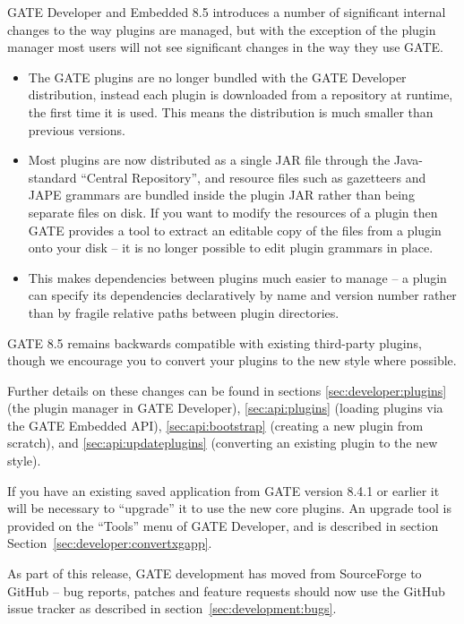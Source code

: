 
GATE Developer and Embedded 8.5 introduces a number of significant internal
changes to the way plugins are managed, but with the exception of the plugin
manager most users will not see significant changes in the way they use GATE.

\begin{itemize}
\item The GATE plugins are no longer bundled with the GATE Developer
  distribution, instead each plugin is downloaded from a repository at runtime,
  the first time it is used.  This means the distribution is much smaller than
  previous versions.
\item Most plugins are now distributed as a single JAR file through the
  Java-standard ``Central Repository'', and resource files such as gazetteers
  and JAPE grammars are bundled inside the plugin JAR rather than being
  separate files on disk.  If you want to modify the resources of a plugin
  then GATE provides a tool to extract an editable copy of the files from
  a plugin onto your disk -- it is no longer possible to edit plugin grammars
  in place.
\item This makes dependencies between plugins much easier to manage -- a plugin
  can specify its dependencies declaratively by name and version number rather
  than by fragile relative paths between plugin directories.
\end{itemize}

GATE 8.5 remains backwards compatible with existing third-party plugins, though
we encourage you to convert your plugins to the new style where possible.

Further details on these changes can be found in sections
\ref{sec:developer:plugins} (the plugin manager in GATE Developer),
\ref{sec:api:plugins} (loading plugins via the GATE Embedded API),
\ref{sec:api:bootstrap} (creating a new plugin from scratch), and
\ref{sec:api:updateplugins} (converting an existing plugin to the new style).

If you have an existing saved application from GATE version 8.4.1 or earlier it
will be necessary to ``upgrade'' it to use the new core plugins.  An upgrade
tool is provided on the ``Tools'' menu of GATE Developer, and is described in
section Section~\ref{sec:developer:convertxgapp}.


As part of this release, GATE development has moved from SourceForge to GitHub
-- bug reports, patches and feature requests should now use the GitHub issue
tracker as described in section~\ref{sec:development:bugs}.

